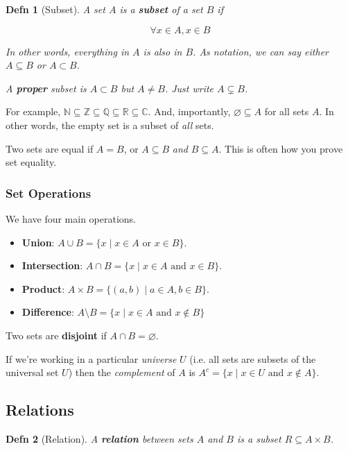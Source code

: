 \documentclass[12pt]{article}
\def\N{{\mathbb N}}
\def\Z{{\mathbb Z}}
\def\Q{{\mathbb Q}}
\def\R{{\mathbb R}}
\def\C{{\mathbb C}}
\newtheorem{definition}{Defn}
\theoremstyle{remark}
\theoremstyle{remark}
\theoremstyle{remark}
\theoremstyle{remark}
\theoremstyle{remark}
\begin{document}
\begin{definition}[Subset]
	A set $A$ is a {\bf subset} of a set $B$ if

	\[
		\forall x \in A, x \in B
	\]

	In other words, everything in $A$ is also in $B$. As notation, we can say
	either $A \subseteq B$ or $A \subset B$.

	A {\bf proper} subset is $A \subset B$ but $A \ne B$. Just write $A
		\subsetneq B$.
\end{definition}

For example, $\N \subseteq \Z \subseteq \Q \subseteq \R \subseteq \C$. And,
importantly, $\varnothing \subseteq A$ for all sets $A$. In other words, the
empty set is a subset of {\it all} sets.

Two sets are equal if $A = B$, or $A \subseteq B$ {\it and} $B \subseteq A$.
This is often how you prove set equality.

\subsubsection{Set Operations}

We have four main operations.

\begin{itemize}
	\item {\bf Union}: $A \cup B = \{x \mid x \in A \text{ or } x \in B \}$.
	\item {\bf Intersection}: $A \cap B = \{ x \mid x \in A \text{ and } x \in B \}$.
	\item {\bf Product}: $A \times B = \{(a, b) \mid a \in A, b \in B \}$.
	\item {\bf Difference}: $A \setminus B = \{x \mid x \in A \text{ and } x \not\in B\}$
\end{itemize}

Two sets are {\bf disjoint} if $A \cap B = \varnothing$.

If we're working in a particular {\it universe} $U$ (i.e. all sets are subsets
of the universal set $U$) then the {\it complement} of $A$ is $A^c = \{x \mid x
	\in U \text{ and } x \not\in A \}$.

\subsection{Relations}

\begin{definition}[Relation]
	A {\bf relation} between sets $A$ and $B$ is a subset $R \subseteq A \times B$.
\end{definition}
\end{document}
